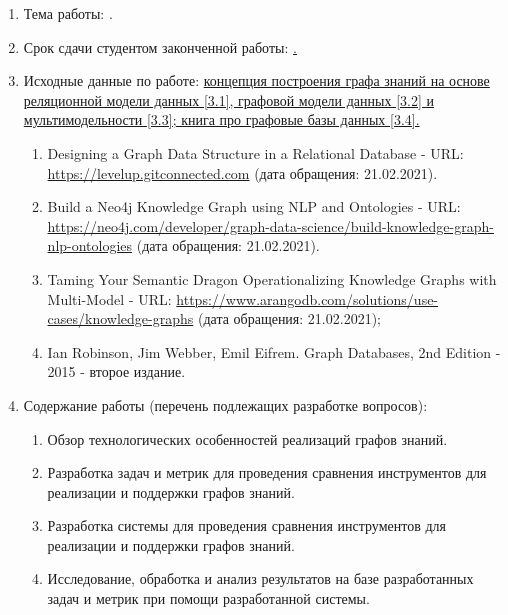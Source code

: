 \begin{enumerate}[1.]
\item Тема работы: {\expandafter \ulined \thesisTitle.}
\item Срок сдачи студентом законченной работы: \uline{\thesisDeadline.}
\item Исходные данные по работе: \uline{концепция построения графа знаний на основе реляционной модели данных [3.1], графовой модели данных [3.2] и мультимодельности [3.3]; книга про графовые базы данных [3.4].}
\begin{enumerate}[label=\theenumi\arabic*.]
\item Designing a Graph Data Structure in a Relational Database - URL: \url{https://levelup.gitconnected.com} (дата обращения: 21.02.2021).
\item Build a Neo4j Knowledge Graph using NLP and Ontologies - URL: \url{https://neo4j.com/developer/graph-data-science/build-knowledge-graph-nlp-ontologies} (дата обращения: 21.02.2021).
\item Taming Your Semantic Dragon Operationalizing Knowledge Graphs with Multi-Model - URL: \url{https://www.arangodb.com/solutions/use-cases/knowledge-graphs} (дата обращения: 21.02.2021);
\item Ian Robinson, Jim Webber, Emil Eifrem. Graph Databases, 2nd Edition - 2015 - второе издание.
\end{enumerate}
\item Содержание работы (перечень подлежащих разработке вопросов):
\begin{enumerate}[label=\theenumi\arabic*.]
\item Обзор технологических особенностей реализаций графов знаний.
\item Разработка задач и метрик для проведения сравнения инструментов для реализации и поддержки графов знаний.
\item Разработка системы для проведения сравнения инструментов для реализации и поддержки графов знаний.
\item Исследование, обработка и анализ результатов на базе разработанных задач и метрик при помощи разработанной системы.
\end{enumerate}

\end{enumerate}
